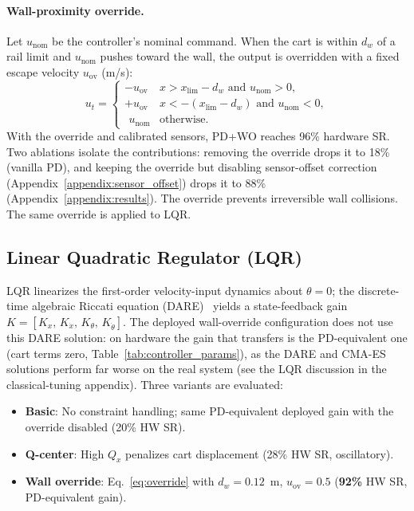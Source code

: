 \paragraph{Wall-proximity override.}
Let $u_\text{nom}$ be the controller's nominal command. When the cart is
within $d_w$ of a rail limit and $u_\text{nom}$ pushes toward the wall, the
output is overridden with a fixed escape velocity $u_\text{ov}$ (m/s):
\begin{equation}
  u_t = \begin{cases}
    -u_\text{ov} & x > x_\text{lim} - d_w \text{ and } u_\text{nom} > 0,\\
    +u_\text{ov} & x < -(x_\text{lim} - d_w) \text{ and } u_\text{nom} < 0,\\
    \ \, u_\text{nom} & \text{otherwise.}
  \end{cases}
  \label{eq:override}
\end{equation}
With the override and calibrated sensors, PD+WO reaches 96\% hardware SR.
Two ablations isolate the contributions: removing the override drops it to
18\% (vanilla PD), and keeping the override but disabling sensor-offset
correction (Appendix~\ref{appendix:sensor_offset}) drops it to 88\%
(Appendix~\ref{appendix:results}). The override prevents irreversible wall
collisions. The same override is applied to LQR.

\subsection{Linear Quadratic Regulator (LQR)}

LQR linearizes the first-order velocity-input dynamics
about $\theta = 0$; the discrete-time algebraic
Riccati equation (DARE)~\cite{lewis2012optimal} yields a state-feedback
gain $K = [K_x,\, K_{\dot x},\, K_\theta,\, K_{\dot\theta}]$. The deployed
wall-override configuration does not use this DARE solution: on hardware the
gain that transfers is the PD-equivalent one (cart terms zero,
Table~\ref{tab:controller_params}), as the DARE and CMA-ES solutions perform
far worse on the real system (see the LQR discussion in the classical-tuning
appendix).
Three variants are evaluated:
\begin{itemize}
  \item \textbf{Basic}: No constraint handling; same PD-equivalent
    deployed gain with the override disabled (20\% HW SR).
  \item \textbf{Q-center}: High $Q_x$ penalizes cart displacement
        (28\% HW SR, oscillatory).
  \item \textbf{Wall override}: Eq.~\eqref{eq:override} with
        $d_w{=}0.12$~m, $u_\text{ov}{=}0.5$ (\textbf{92\%} HW SR, PD-equivalent gain).
\end{itemize}

